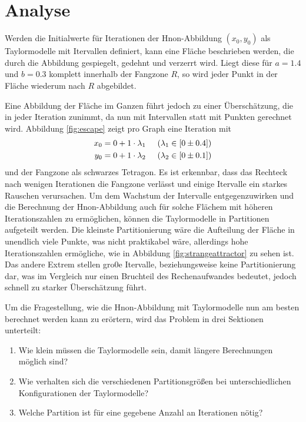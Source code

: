 
\chapter{Analyse}
\label{ch:Analyse}
Werden die Initialwerte für Iterationen der H\e non-Abbildung $(x_0, y_0)$ als Taylormodelle mit Itervallen definiert, kann eine Fläche beschrieben werden, die durch die Abbildung gespiegelt, gedehnt und verzerrt wird. Liegt diese für $a=1.4$ und $b=0.3$ komplett innerhalb der Fangzone $R$, so wird jeder Punkt in der Fläche wiederum nach $R$ abgebildet. 

Eine Abbildung der Fläche im Ganzen führt jedoch zu einer Überschätzung, die in jeder Iteration zunimmt, da nun mit Intervallen statt mit Punkten gerechnet wird. Abbildung \ref{fig:escape} zeigt pro Graph eine Iteration mit 
\begin{align*}
x_0 = 0 + 1 \cdot \lambda_1 & \hspace{0.5cm} (\lambda_1 \in [0 \pm 0.4]) \\
 y_0 = 0 + 1 \cdot \lambda_2 & \hspace{0.5cm} (\lambda_2 \in [0 \pm 0.1])
\end{align*}
und der Fangzone als schwarzes Tetragon. Es ist erkennbar, dass das Rechteck nach wenigen Iterationen die Fangzone verlässt und einige Itervalle ein starkes Rauschen verursachen. Um dem Wachstum der Intervalle entgegenzuwirken und die Berechnung der H\e non-Abbildung auch für solche Flächem mit höheren Iterationszahlen zu ermöglichen, können die Taylormodelle in Partitionen aufgeteilt werden. Die kleinste Partitionierung wäre die Aufteilung der Fläche in unendlich viele Punkte, was nicht praktikabel wäre, allerdings hohe Iterationszahlen ermögliche, wie in Abbildung \ref{fig:strangeattractor} zu sehen ist. Das andere Extrem stellen gro0e Itervalle, beziehungsweise keine Partitionierung dar, was im Vergleich nur einen Bruchteil des Rechenaufwandes bedeutet, jedoch schnell zu starker Überschätzung führt.

Um die Fragestellung, wie die H\e non-Abbildung mit Taylormodelle nun am besten berechnet werden kann zu erörtern, wird das Problem in drei Sektionen unterteilt:

\begin{enumerate}
 \item Wie klein müssen die Taylormodelle sein, damit längere Berechnungen möglich sind?
 \item Wie verhalten sich die verschiedenen Partitionsgrößen bei unterschiedlichen Konfigurationen der Taylormodelle?
 \item Welche Partition ist für eine gegebene Anzahl an Iterationen nötig?
\end{enumerate}






